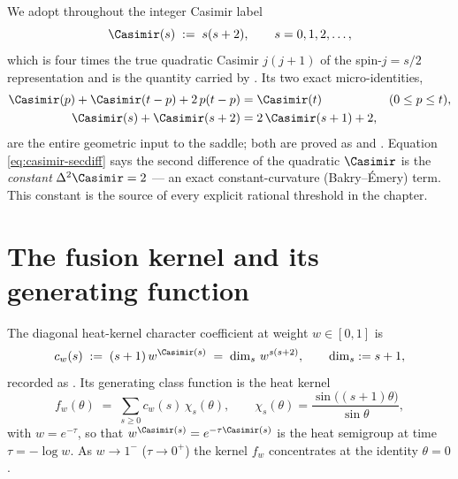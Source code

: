We adopt throughout the integer Casimir label
\[
  \Casimir(s) \;:=\; s(s+2), \qquad s = 0,1,2,\dots,
\]
which is four times the true quadratic Casimir $j(j+1)$ of the spin-$j=s/2$
representation and is the quantity carried by .  Its two
exact micro-identities,
\begin{align}
  \Casimir(p) + \Casimir(t-p) + 2\,p(t-p) &= \Casimir(t)
    && (0\le p\le t), \label{eq:casimir-split}\\
  \Casimir(s) + \Casimir(s+2) &= 2\,\Casimir(s+1) + 2,
    \label{eq:casimir-secdiff}
\end{align}
are the entire geometric input to the saddle; both are proved as
 and
.  Equation
\eqref{eq:casimir-secdiff} says the second difference of the quadratic $\Casimir$
is the \emph{constant} $\Delta^{2}\Casimir = 2$ — an exact constant-curvature
(Bakry--Émery) term.  This constant is the source of every explicit rational
threshold in the chapter.

\section{The fusion kernel and its generating function}
\label{sec:core-b-kernel}

\begin{definition}
\label{def:core-b-coeff}
The diagonal \SUtwo{} heat-kernel character coefficient at weight $w\in[0,1]$ is
\[
  c_w(s) \;:=\; (s+1)\,w^{\Casimir(s)} \;=\; \dim_s\, w^{s(s+2)},
  \qquad \dim_s := s+1,
\]
recorded as .  Its generating class function is the
\SUtwo{} heat kernel
\[
  f_w(\theta) \;=\; \sum_{s\ge 0} c_w(s)\,\chi_s(\theta),
  \qquad \chi_s(\theta) = \frac{\sin\bigl((s+1)\theta\bigr)}{\sin\theta},
\]
with $w = e^{-\tau}$, so that $w^{\Casimir(s)} = e^{-\tau\Casimir(s)}$ is the heat
semigroup at time $\tau = -\log w$.  As $w\to 1^{-}$ ($\tau\to 0^{+}$) the kernel
$f_w$ concentrates at the identity $\theta=0$.
\end{definition}

